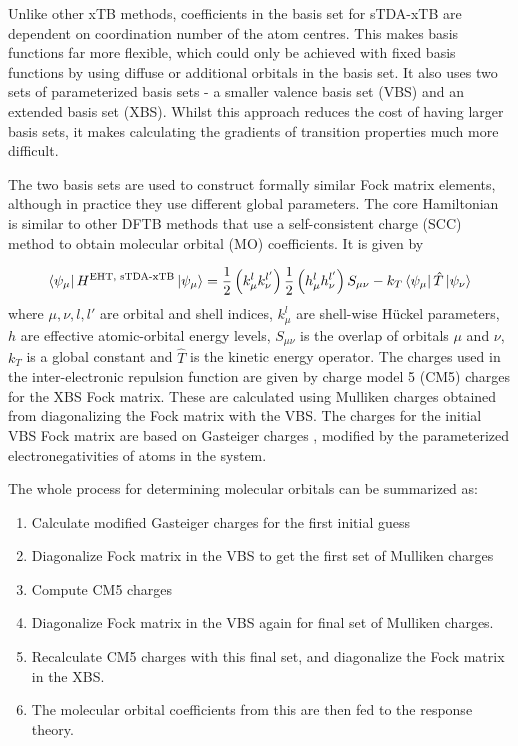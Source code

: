 Unlike other xTB methods, coefficients in the basis set for sTDA-xTB are dependent
on coordination number of the atom centres. This makes basis functions far more 
flexible, which could only be achieved with fixed basis functions by using diffuse
or additional orbitals in the basis set. It also uses two sets of parameterized 
basis sets - a smaller valence basis set (VBS) and an extended basis set (XBS).
Whilst this approach reduces the cost of having larger basis sets, it makes calculating
the gradients of transition properties much more difficult.

The two basis sets are used to construct formally similar Fock matrix elements,
although in practice they use different global parameters. The core Hamiltonian
is similar to other DFTB methods that use a self-consistent charge (SCC) method 
to obtain molecular orbital (MO) coefficients. It is given by

\begin{equation}
\bra{\psi_\mu} H^{\text{EHT, sTDA-xTB}} \ket{\psi_\mu}= \frac{1}{2} \left(k^l_\mu k^{l'}_\nu\right) \frac{1}{2} \left(h^l_\mu h^{l'}_\nu\right) S_{\mu\nu} - k_T \bra{\psi_\mu}\hat{T}\ket{\psi_\nu}
\end{equation}
%
where $\mu,\nu,l,l'$ are orbital and shell indices, $k^l_\mu$ are shell-wise 
H{\"u}ckel parameters, $h$ are effective atomic-orbital energy levels, $S_{\mu\nu}$
is the overlap of orbitals $\mu$ and $\nu$, $k_T$ is a global constant and $\hat{T}$
is the kinetic energy operator. The charges used in the inter-electronic repulsion 
function are given by charge model 5 (CM5) \cite{Marenich2012} charges for the XBS
Fock matrix. These are calculated using Mulliken charges obtained from diagonalizing
the Fock matrix with the VBS. The charges for the initial VBS Fock matrix are based
on Gasteiger charges \cite{Gasteiger1978}, modified by the parameterized
electronegativities of atoms in the system.

The whole process for determining molecular orbitals can be summarized as:
\begin{enumerate}
	\item Calculate modified Gasteiger charges for the first initial guess
	\item Diagonalize Fock matrix in the VBS to get the first set of Mulliken charges
	\item Compute CM5 charges
	\item Diagonalize Fock matrix in the VBS again for final set of Mulliken charges.
	\item Recalculate CM5 charges with this final set, and diagonalize the Fock matrix in the XBS. 
	\item The molecular orbital coefficients from this are then fed to the response theory.
\end{enumerate}

